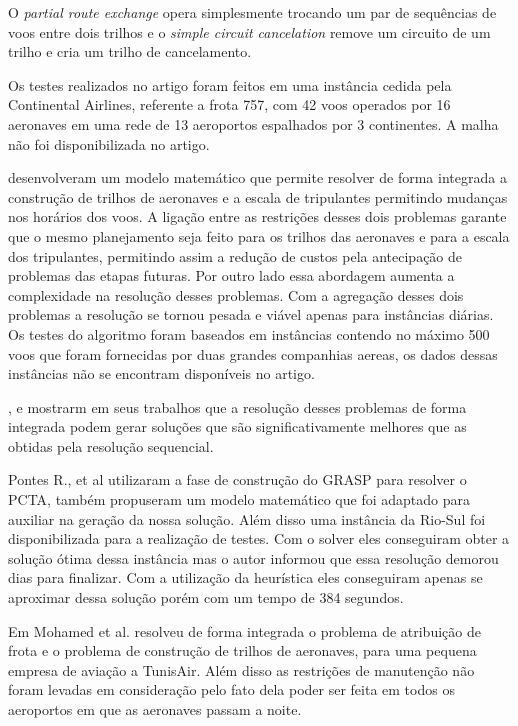O \textit{partial route exchange} opera simplesmente trocando um par de
sequências de voos entre dois trilhos e o \textit{simple circuit cancelation}
remove um circuito de um trilho e cria um trilho de cancelamento. 

Os testes realizados no artigo foram feitos em uma instância cedida pela
Continental Airlines, referente a frota 757, com 42 voos operados por 16
aeronaves em uma rede de 13 aeroportos espalhados por 3 continentes. A malha
não foi disponibilizada no artigo.

		
\cite{mercier2007} desenvolveram um modelo matemático que permite resolver de
forma integrada a construção de trilhos de aeronaves e a escala de tripulantes
permitindo mudanças nos horários dos voos. A ligação entre as restrições desses
dois problemas garante que o mesmo planejamento seja feito para os trilhos das
aeronaves e para a escala dos tripulantes, permitindo assim a redução de custos
pela antecipação de problemas das etapas futuras. Por outro lado essa abordagem
aumenta a complexidade na resolução desses problemas. Com a agregação desses
dois problemas a resolução se tornou pesada e viável apenas para instâncias
diárias. Os testes do algoritmo foram baseados em instâncias contendo no máximo
500 voos que foram fornecidas por duas grandes companhias aereas, os dados
dessas instâncias não se encontram disponíveis no artigo.

\cite{cordeau2001}, \cite{klabjan2002} e \cite{mainville2003} mostrarm em seus
trabalhos que a resolução desses problemas de forma integrada podem gerar
soluções que são significativamente melhores que as obtidas pela resolução
sequencial.

  		
Pontes R., et al \cite{pontes2002} utilizaram a fase de construção do GRASP
para resolver o PCTA, também propuseram um modelo matemático que foi
adaptado para auxiliar na geração da nossa solução. Além disso uma instância
da Rio-Sul foi disponibilizada para a realização de testes. Com o solver eles
conseguiram obter a solução ótima dessa instância mas o autor informou que
essa resolução demorou dias para finalizar. Com a utilização da heurística
eles conseguiram apenas se aproximar dessa solução porém com um tempo de 384
segundos. 
		
Em \cite{mohamed2011} Mohamed et al. resolveu de forma integrada o problema
de atribuição de frota e o problema de construção de trilhos de aeronaves,
para uma pequena empresa de aviação a TunisAir. Além disso as restrições de
manutenção não foram levadas em consideração pelo fato dela poder ser feita
em todos os aeroportos em que as aeronaves passam a noite.
		
 